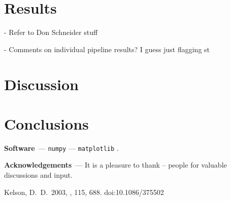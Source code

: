 \documentclass[modern]{aastex631}
\renewcommand{\paragraph}[1]{\medskip\par\noindent\textbf{#1}~---}
\begin{document}
\section{Results}\label{sec:results}

- Refer to Don Schneider stuff

- Comments on individual pipeline results? I guess just flagging st


\section{Discussion} \label{sec:discussion}


\section{Conclusions}



\paragraph{Software}
\texttt{numpy} \citep{numpy} ---
\texttt{matplotlib} \citep{matplotlib}.

\paragraph{Acknowledgements}
It is a pleasure to thank
-- people
for valuable discussions and input.

\begin{thebibliography}{dummy}
 Kelson, D.~D.\ 2003, \pasp, 115, 688. doi:10.1086/375502
\end{thebibliography}
\end{document}
